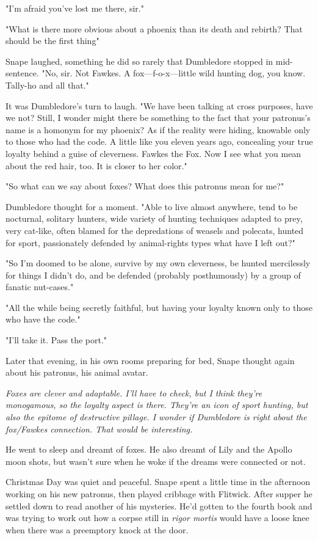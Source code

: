 "I'm afraid you've lost me there, sir."

"What is there more obvious about a phoenix than its death and rebirth? That should be the first thing{\el}"

Snape laughed, something he did so rarely that Dumbledore stopped in mid-sentence. "No, sir. Not Fawkes. A fox—f-o-x—little wild hunting dog, you know. Tally-ho and all that."

It was Dumbledore's turn to laugh. "We have been talking at cross purposes, have we not? Still, I wonder{\el} might there be something to the fact that your patronus's name is a homonym for my phoenix? As if the reality were hiding, knowable only to those who had the code. A little like you eleven years ago, concealing your true loyalty behind a guise of cleverness. Fawkes the Fox. Now I see what you mean about the red hair, too. It is closer to her color."

"So what can we say about foxes? What does this patronus mean for me?"

Dumbledore thought for a moment. "Able to live almost anywhere, tend to be nocturnal, solitary hunters, wide variety of hunting techniques adapted to prey, very cat-like, often blamed for the depredations of weasels and polecats, hunted for sport, passionately defended by animal-rights types{\el} what have I left out?"

"So I'm doomed to be alone, survive by my own cleverness, be hunted mercilessly for things I didn't do, and be defended (probably posthumously) by a group of fanatic nut-cases."

"All the while being secretly faithful, but having your loyalty known only to those who have the code."

"I'll take it. Pass the port."

Later that evening, in his own rooms preparing for bed, Snape thought again about his patronus, his animal avatar.

\emph{Foxes are clever and adaptable. I'll have to check, but I think they're monogamous, so the loyalty aspect is there. They're an icon of sport hunting, but also the epitome of destructive pillage. I wonder if Dumbledore is right about the fox\slash Fawkes connection. That would be interesting.}

He went to sleep and dreamt of foxes. He also dreamt of Lily and the Apollo moon shots, but wasn't sure when he woke if the dreams were connected or not.

Christmas Day was quiet and peaceful. Snape spent a little time in the afternoon working on his new patronus, then played cribbage with Flitwick. After supper he settled down to read another of his mysteries. He'd gotten to the fourth book and was trying to work out how a corpse still in \emph{rigor mortis} would have a loose knee when there was a preemptory knock at the door.

